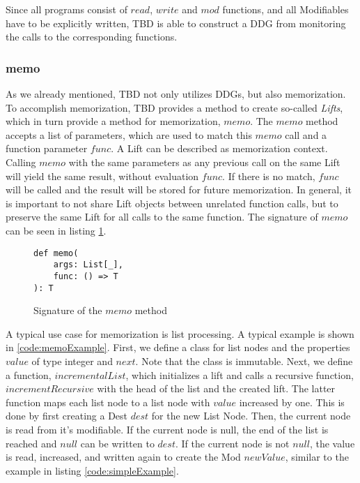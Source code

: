 Since all programs consist of $read$, $write$ and $mod$ functions, and all Modifiables have to be explicitly written, TBD is able to construct a DDG from monitoring the calls to the corresponding functions.

\subsubsection{memo}
As we already mentioned, TBD not only utilizes DDGs, but also memorization. To accomplish memorization, TBD provides a method to create so-called \textit{Lifts}, which in turn provide a method for memorization, $memo$. The $memo$ method accepts a list of parameters, which are used to match this $memo$ call and a function parameter $func$. A Lift can be described as memorization context. Calling $memo$ with the same parameters as any previous call on the same Lift will yield the same result, without evaluation $func$. If there is no match, $func$ will be called and the result will be stored for future memorization. In general, it is important to not share Lift objects between unrelated function calls, but to preserve the same Lift for all calls to the same function. The signature of $memo$ can be seen in listing \ref{code:memo}.

\begin{figure}
\begin{lstlisting}[frame=single,basicstyle=\ttfamily]
def memo(
    args: List[_], 
    func: () => T
): T
\end{lstlisting}
\caption{Signature of the $memo$ method}
\label{code:memo}
\end{figure}

A typical use case for memorization is list processing. A typical example is shown in \ref{code:memoExample}. First, we define a class for list nodes and the properties $value$ of type integer and $next$. Note that the class is immutable. Next, we define a function, $incrementalList$, which initializes a lift and calls a recursive function, $incrementRecursive$ with the head of the list and the created lift. The latter function maps each list node to a list node with $value$ increased by one. This is done by first creating a Dest $dest$ for the new List Node. Then, the current node is read from it's modifiable. If the current node is null, the end of the list is reached and $null$ can be written to $dest$. If the current node is not $null$, the value is read, increased, and written again to create the Mod $newValue$, similar to the example in listing \ref{code:simpleExample}. 

